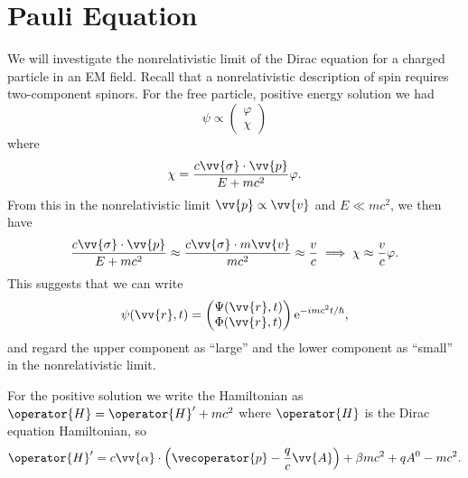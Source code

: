 \documentclass[fleqn]{NotesClass}
\newcommand*{\e}{\mathrm{e}}
\newcommand*{\hamiltonian}{H}
\begin{document}
    \section{Pauli Equation}
    We will investigate the nonrelativistic limit of the Dirac equation for a charged particle in an EM field.
    Recall that a nonrelativistic description of spin requires two-component spinors.
    For the free particle, positive energy solution we had
    \begin{equation}
        \psi \propto 
        \begin{pmatrix}
            \varphi\\ \chi
        \end{pmatrix}
    \end{equation}
    where
    \begin{equation}
        \chi = \frac{c\vv{\sigma}\cdot\vv{p}}{E + mc^2}\varphi.
    \end{equation}
    From this in the nonrelativistic limit \(\vv{p} \propto \vv{v}\) and \(E \ll mc^2\), we then have
    \begin{equation}
        \frac{c\vv{\sigma}\cdot\vv{p}}{E + mc^2} \approx \frac{c\vv{\sigma} \cdot m\vv{v}}{mc^2} \approx \frac{v}{c} \implies \chi \approx \frac{v}{c}\varphi.
    \end{equation}
    This suggests that we can write
    \begin{equation}
        \psi(\vv{r}, t) = 
        \begin{pmatrix}
            \Psi(\vv{r}, t)\\ \Phi(\vv{r}, t)
        \end{pmatrix}
        \e^{-imc^2t/\hbar},
    \end{equation}
    and regard the upper component as \enquote{large} and the lower component as \enquote{small} in the nonrelativistic limit.
    
    For the positive solution we write the Hamiltonian as \(\operator{\hamiltonian} = \operator{\hamiltonian}' + mc^2\) where \(\operator{\hamiltonian}\) is the Dirac equation Hamiltonian, so
    \begin{equation}
        \operator{\hamiltonian}' = c\vv{\alpha} \cdot \left( \vecoperator{p} - \frac{q}{c}\vv{A} \right) + \beta mc^2 + qA^0 - mc^2.
    \end{equation}
    
\end{document}
